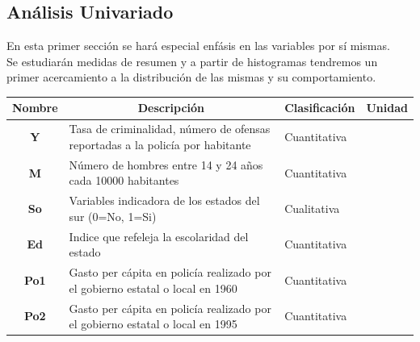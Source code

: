 \documentclass[11pt,a4paper]{article}\usepackage[]{graphicx}\usepackage[]{color}
\begin{document}
\subsection{Análisis Univariado}
En esta primer sección se hará especial enfásis en las variables por sí mismas.
\\

Se estudiarán medidas de resumen y a partir de histogramas tendremos un primer acercamiento a la distribución de las mismas y su comportamiento.

\begin{table}[h]
\begin{tabular}{|c|l|l|l|}
\hline
\textbf{Nombre} & \multicolumn{1}{c|}{\textbf{Descripción}}                                                                                                              & \multicolumn{1}{c|}{\textbf{Clasificación}} & \multicolumn{1}{c|}{\textbf{Unidad}} \\ \hline
\textbf{Y}      & Tasa de criminalidad, número de ofensas reportadas a la policía por habitante                                                                          & Cuantitativa                                &                                      \\ \hline
\textbf{M}      & Número de hombres entre 14 y 24 años cada 10000 habitantes                                                                                             & Cuantitativa                                &                                      \\ \hline
\textbf{So}     & Variables indicadora de los estados del sur (0=No, 1=Si)                                                                                               & Cualitativa                                 &                                      \\ \hline
\textbf{Ed}     & Indice que refeleja la escolaridad del estado                                                                                                          & Cuantitativa                                &                                      \\ \hline
\textbf{Po1}    & Gasto per cápita en policía realizado por el gobierno estatal o local en 1960                                                                          & Cuantitativa                                &                                      \\ \hline
\textbf{Po2}    & Gasto per cápita en policía realizado por el gobierno estatal o local en 1995                                                                          & Cuantitativa                                &                                      \\ \hline

\end{tabular}
\end{table}
\end{document}
